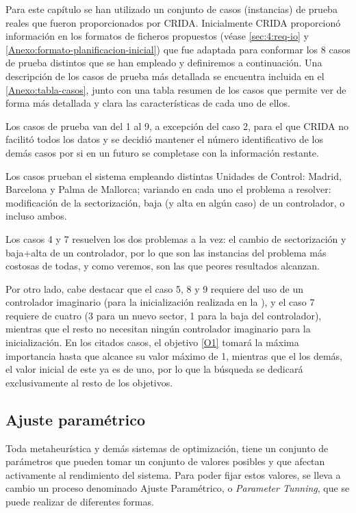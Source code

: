 Para este capítulo se han utilizado un conjunto de casos (instancias) de prueba reales que fueron proporcionados por CRIDA. Inicialmente CRIDA proporcionó información en los formatos de ficheros propuestos (véase \autoref{sec:4:req-io} y \autoref{Anexo:formato-planificacion-inicial}) que fue adaptada para conformar los 8 casos de prueba distintos que se han empleado y definiremos a continuación. Una descripción de los casos de prueba más detallada se encuentra incluida en el \autoref{Anexo:tabla-casos}, junto con una tabla resumen de los casos que permite ver de forma más detallada y clara las características de cada uno de ellos.

Los casos de prueba van del 1 al 9, a excepción del caso 2, para el que \gls{CRIDA} no facilitó todos los datos y se decidió mantener el número identificativo de los demás casos por si en un futuro se completase con la información restante.

Los casos prueban el sistema empleando distintas Unidades de Control: Madrid, Barcelona y Palma de Mallorca; variando en cada uno el problema a resolver: modificación de la sectorización, baja (y alta en algún caso) de un controlador, o incluso ambos.

Los casos 4 y 7 resuelven los dos problemas a la vez: el cambio de sectorización y baja+alta de un controlador, por lo que son las instancias del problema más costosas de todas, y como veremos, son las que peores resultados alcanzan. %

Por otro lado, cabe destacar que el caso 5, 8 y 9 requiere del uso de un controlador imaginario (para la inicialización realizada en la \faseuno{}), y el caso 7 requiere de cuatro (3 para un nuevo sector, 1 para la baja del controlador), mientras que el resto no necesitan ningún controlador imaginario para la inicialización. En los citados casos, el objetivo \ref{O1} tomará la máxima importancia hasta que alcance su valor máximo de 1, mientras que el los demás, el valor inicial de este ya es de uno, por lo que la búsqueda se dedicará exclusivamente al resto de los objetivos.

\subsection{Ajuste paramétrico}
Toda metaheurística y demás sistemas de optimización, tiene un conjunto de parámetros que pueden tomar un conjunto de valores posibles y que afectan activamente al rendimiento del sistema. Para poder fijar estos valores, se lleva a cambio un proceso denominado Ajuste Paramétrico, o \textit{Parameter Tunning}, que se puede realizar de diferentes formas.

